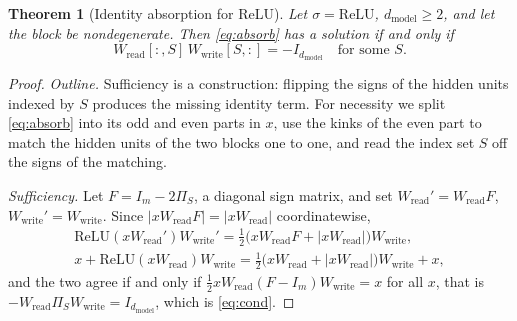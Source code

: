 \documentclass[10pt]{article}
\newtheorem{theorem}{Theorem}
\theoremstyle{definition}
\theoremstyle{remark}
\newcommand{\Wread}{W_{\mathrm{read}}}
\newcommand{\Wwrite}{W_{\mathrm{write}}}
\newcommand{\dm}{d_{\mathrm{model}}}
\begin{document}
\begin{theorem}[Identity absorption for ReLU]\label{thm:f3}
Let $\sigma = \mathrm{ReLU}$, $\dm \ge 2$, and let the block be nondegenerate. Then \eqref{eq:absorb} has a solution if and only if
\begin{equation}\label{eq:cond}
\Wread[{:},S]\,\Wwrite[S,{:}] = -I_{\dm} \quad\text{for some } S.
\end{equation}
\end{theorem}
\begin{proof}
\emph{Outline.} Sufficiency is a construction: flipping the signs of the hidden units indexed by $S$ produces the missing identity term. For necessity we split \eqref{eq:absorb} into its odd and even parts in $x$, use the kinks of the even part to match the hidden units of the two blocks one to one, and read the index set $S$ off the signs of the matching.

\emph{Sufficiency.} Let $F = I_m - 2\Pi_S$, a diagonal sign matrix, and set $\Wread' = \Wread F$, $\Wwrite' = \Wwrite$. Since $|x\Wread F| = |x\Wread|$ coordinatewise,
\begin{gather*}
\mathrm{ReLU}(x\Wread')\Wwrite' = \tfrac12\big(x\Wread F + |x\Wread|\big)\Wwrite,\\
x + \mathrm{ReLU}(x\Wread)\Wwrite = \tfrac12\big(x\Wread + |x\Wread|\big)\Wwrite + x ,
\end{gather*}
and the two agree if and only if $\tfrac12 x\Wread(F - I_m)\Wwrite = x$ for all $x$, that is $-\Wread\Pi_S\Wwrite = I_{\dm}$, which is \eqref{eq:cond}.


\end{proof}
\end{document}
